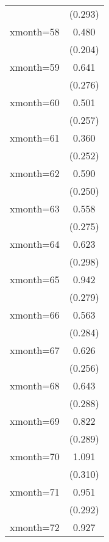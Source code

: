 \begin{table}[htbp]
\begin{tabular}{l*{1}{c}}
                    &     (0.293)         \\
[1em]
xmonth=58           &       0.480\sym{*}  \\
                    &     (0.204)         \\
[1em]
xmonth=59           &       0.641\sym{*}  \\
                    &     (0.276)         \\
[1em]
xmonth=60           &       0.501         \\
                    &     (0.257)         \\
[1em]
xmonth=61           &       0.360         \\
                    &     (0.252)         \\
[1em]
xmonth=62           &       0.590\sym{*}  \\
                    &     (0.250)         \\
[1em]
xmonth=63           &       0.558\sym{*}  \\
                    &     (0.275)         \\
[1em]
xmonth=64           &       0.623\sym{*}  \\
                    &     (0.298)         \\
[1em]
xmonth=65           &       0.942\sym{***}\\
                    &     (0.279)         \\
[1em]
xmonth=66           &       0.563\sym{*}  \\
                    &     (0.284)         \\
[1em]
xmonth=67           &       0.626\sym{*}  \\
                    &     (0.256)         \\
[1em]
xmonth=68           &       0.643\sym{*}  \\
                    &     (0.288)         \\
[1em]
xmonth=69           &       0.822\sym{**} \\
                    &     (0.289)         \\
[1em]
xmonth=70           &       1.091\sym{***}\\
                    &     (0.310)         \\
[1em]
xmonth=71           &       0.951\sym{**} \\
                    &     (0.292)         \\
[1em]
xmonth=72           &       0.927\sym{***}\\

\end{tabular}
\end{table}
